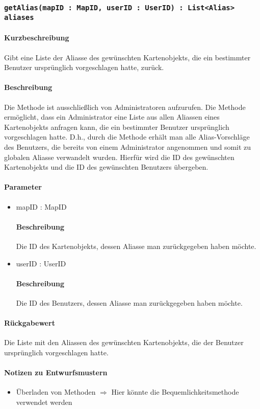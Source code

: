 \subsubsection{\texttt{getAlias(mapID : MapID, userID : UserID) : List<Alias> aliases}}%
\paragraph*{Kurzbeschreibung}
Gibt eine Liste der Aliasse des gewünschten Kartenobjekts, die ein bestimmter Benutzer ursprünglich vorgeschlagen hatte, zurück.
\paragraph*{Beschreibung}
Die Methode ist ausschließlich von Administratoren aufzurufen.
Die Methode ermöglicht, dass ein Administrator eine Liste aus allen Aliassen eines Kartenobjekts anfragen kann, die ein bestimmter Benutzer ursprünglich vorgeschlagen hatte.
D.h., durch die Methode erhält man alle Alias-Vorschläge des Benutzers, die bereits von einem Administrator angenommen und somit zu globalen Aliasse verwandelt wurden.
Hierfür wird die ID des gewünschten Kartenobjekts und die ID des gewünschten Benutzers übergeben.
\paragraph*{Parameter}
\begin{itemize}
    \item mapID : MapID
    		\paragraph*{Beschreibung}
    		Die ID des Kartenobjekts, dessen Aliasse man zurückgegeben haben möchte.
    	\item userID : UserID
    		\paragraph*{Beschreibung}
    		Die ID des Benutzers, dessen Aliasse man zurückgegeben haben möchte.
\end{itemize}
\paragraph*{Rückgabewert}
Die Liste mit den Aliassen des gewünschten Kartenobjekts, die der Benutzer ursprünglich vorgeschlagen hatte.

\paragraph*{Notizen zu Entwurfsmustern}
\begin{itemize}
	\item Überladen von Methoden $\Rightarrow$ Hier könnte die Bequemlichkeitsmethode verwendet werden
\end{itemize}

